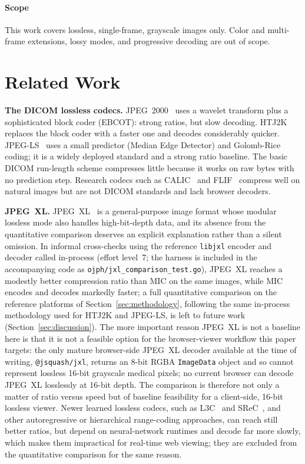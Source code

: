 \documentclass[journal]{IEEEtran}
\begin{document}
\paragraph{Scope} This work covers lossless, single-frame, grayscale images
only. Color and multi-frame extensions, lossy modes, and progressive decoding
are out of scope.

\section{Related Work}
\label{sec:related}

\textbf{The DICOM lossless codecs.} JPEG~2000~\cite{taubman2002} uses a wavelet
transform plus a sophisticated block coder (EBCOT): strong ratios, but slow
decoding. HTJ2K~\cite{htj2k2019,taubman2022} replaces the block coder with a
faster one and decodes considerably quicker. JPEG-LS~\cite{loco1} uses a small
predictor (Median Edge Detector) and Golomb-Rice coding; it is a widely
deployed standard and a strong ratio baseline. The basic DICOM run-length
scheme compresses little because it works on raw bytes with no prediction step.
Research codecs such as CALIC~\cite{wu1997} and FLIF~\cite{sneyers2016}
compress well on natural images but are not DICOM standards and lack browser
decoders.

\textbf{JPEG~XL.} JPEG~XL~\cite{jpegxl} is a general-purpose image format
whose modular lossless mode also handles high-bit-depth data, and its absence
from the quantitative comparison deserves an explicit explanation rather than
a silent omission. In informal cross-checks using the reference \texttt{libjxl}
encoder and decoder called in-process (effort level~7; the harness is included
in the accompanying code as \texttt{ojph/jxl\_comparison\_test.go}), JPEG~XL
reaches a modestly better compression ratio than MIC on the same images, while
MIC encodes and decodes markedly faster; a full quantitative comparison on the
reference platforms of Section~\ref{sec:methodology}, following the same
in-process methodology used for HTJ2K and JPEG-LS, is left to future work
(Section~\ref{sec:discussion}). The more important reason JPEG~XL is not a
baseline here is that it is not a feasible option for the browser-viewer
workflow this paper targets: the only mature browser-side JPEG~XL decoder
available at the time of writing, \texttt{@jsquash/jxl}, returns an 8-bit RGBA
\texttt{ImageData} object and so cannot represent lossless 16-bit grayscale
medical pixels; no current browser can decode JPEG~XL losslessly at 16-bit
depth. The comparison is therefore not only a matter of ratio versus speed but
of baseline feasibility for a client-side, 16-bit lossless viewer. Newer
learned lossless codecs, such as L3C~\cite{mentzer2019l3c} and
SReC~\cite{cao2020srec}, and other autoregressive or hierarchical
range-coding approaches, can reach still better ratios, but depend on
neural-network runtimes and decode far more slowly, which makes them
impractical for real-time web viewing; they are excluded from the
quantitative comparison for the same reason.
\end{document}

